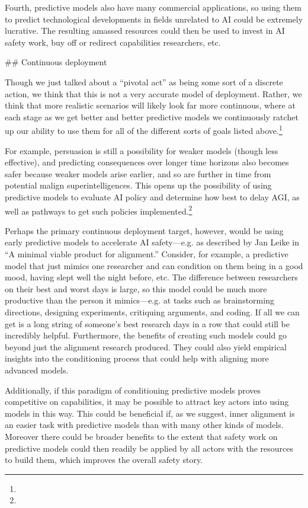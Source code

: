 {{Fourth, predictive models also have many commercial applications, so using them to predict technological developments in fields unrelated to AI could be extremely lucrative. The resulting amassed resources could then be used to invest in AI safety work, buy off or redirect capabilities researchers, etc.


## Continuous deployment

Though we just talked about a ``pivotal act'' as being some sort of a discrete action, we think that this is not a very accurate model of deployment. Rather, we think that more realistic scenarios will likely look far more continuous, where at each stage as we get better and better predictive models we continuously ratchet up our ability to use them for all of the different sorts of goals listed above.\footnote{}

For example, persuasion is still a possibility for weaker models (though less effective), and predicting consequences over longer time horizons also becomes safer because weaker models arise earlier, and so are further in time from potential malign superintelligences. This opens up the possibility of using predictive models to evaluate AI policy and determine how best to delay AGI, as well as pathways to get such policies implemented.\footnote{}

Perhaps the primary continuous deployment target, however, would be using early predictive models to accelerate AI safety---e.g. as described by Jan Leike in ``A minimal viable product for alignment\cite{TODO: cite https://www.alignmentforum.org/posts/fYf9JAwa6BYMt8GBj/link-a-minimal-viable-product-for-alignment}.'' Consider, for example, a predictive model that just mimics one researcher and can condition on them being in a good mood, having slept well the night before, etc. The difference between researchers on their best and worst days is large, so this model could be much more productive than the person it mimics---e.g. at tasks such as brainstorming directions, designing experiments, critiquing arguments, and coding. If all we can get is a long string of someone's best research days in a row that could still be incredibly helpful. Furthermore, the benefits of creating such models could go beyond just the alignment research produced. They could also yield empirical insights into the conditioning process that could help with aligning more advanced models.

Additionally, if this paradigm of conditioning predictive models proves competitive on capabilities, it may be possible to attract key actors into using models in this way. This could be beneficial if, as we suggest, inner alignment is an easier task with predictive models than with many other kinds of models. Moreover there could be broader benefits to the extent that safety work on predictive models could then readily be applied by all actors with the resources to build them, which improves the overall safety story.

}}
